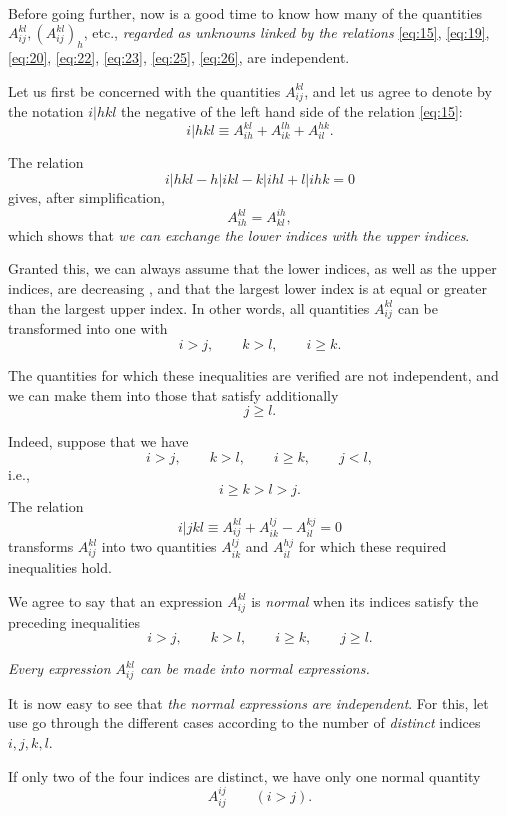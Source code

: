 \documentclass[leqno,12pt]{article}
\theoremstyle{shape1}
\theoremstyle{shape0}
\theoremstyle{shape2}
\theoremstyle{definition}
\begin{document}
\paragraph{}
\label{sec:10}
Before going further, now is a good time to know how many of the quantities $A^{kl}_{ij},(A^{kl}_{ij})_{h}$, etc., \emph{regarded as unknowns linked by the relations} \eqref{eq:15}, \eqref{eq:19}, \eqref{eq:20}, \eqref{eq:22}, \eqref{eq:23}, \eqref{eq:25}, \eqref{eq:26}, are independent.

Let us first be concerned with the quantities $A^{kl}_{ij}$, and let us agree to denote by the notation $i|hkl$ the negative of the left hand side of the relation \eqref{eq:15}:
\[
i|hkl\equiv A^{kl}_{ih}+A^{lh}_{ik}+A^{hk}_{il}.
\]

The relation
\[
i|hkl-h|ikl-k|ihl+l|ihk=0
\]
gives, after simplification,
\[
A^{kl}_{ih}=A^{ih}_{kl},
\]
which shows that \emph{we can exchange the lower indices with the upper indices}.

Granted this, we can always assume that the lower indices, as well as the upper indices, are decreasing , and that the largest lower index is at equal or greater than the largest upper index. In other words, all quantities $A^{kl}_{ij}$ can be transformed into one with
\[
i>j,\qquad k>l,\qquad i\ge k.
\]

The quantities for which these inequalities are verified are not independent, and we can make them into those that satisfy additionally
\[
j\ge l.
\]

Indeed, suppose that we have
\[
i>j,\qquad k>l, \qquad i\ge k, \qquad j<l,
\]
i.e.,
\[
i\ge k >l>j.
\]
The relation
\[
i|jkl\equiv A^{kl}_{ij}+A^{lj}_{ik}-A^{kj}_{il}=0
\]
transforms $A^{kl}_{ij}$ into two quantities $A^{lj}_{ik}$ and $A^{hj}_{il}$ for which these required inequalities hold.

We agree to say that an expression $A^{kl}_{ij}$ is \emph{normal} when its indices satisfy the preceding inequalities 
\begin{equation}
  \label{eq:27}
  i>j,\qquad k>l,\qquad i\ge k,\qquad j\ge l.
\end{equation}

\emph{Every expression $A^{kl}_{ij}$ can be made into normal expressions.}

It is now easy to see that \emph{the normal expressions are independent}. For this, let use go through the different cases according to the number of \emph{distinct} indices $i,j,k,l$.

If only two of the four indices are distinct, we have only one normal quantity
\[
A^{ij}_{ij}\qquad (i>j).
\]
\end{document}
